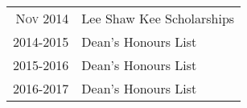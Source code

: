 \documentclass[a4paper,8pt]{article} %
\begin{document}
\begin{tabular}{rl}
\textsc{Nov} 2014 & Lee Shaw Kee Scholarships\\
2014-2015 & Dean's Honours List\\
2015-2016 & Dean's Honours List \\
2016-2017 & Dean's Honours List \\


\end{tabular}










\end{document}
